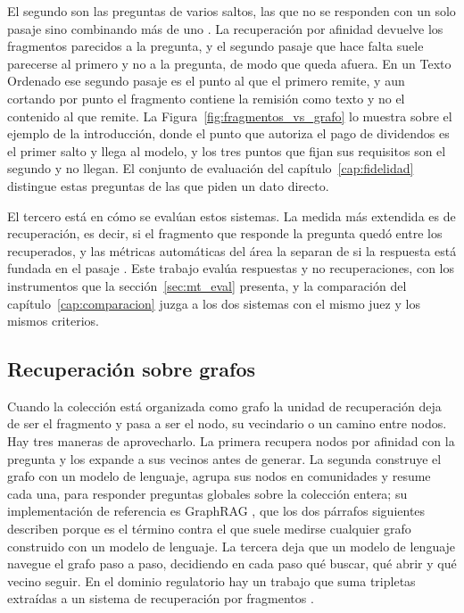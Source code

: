 \documentclass[12pt,a4paper]{report}
\begin{document}
El segundo son las preguntas de varios saltos, las que no se responden con un solo pasaje sino combinando más de uno \cite{yang2018hotpotqa}. La recuperación por afinidad devuelve los fragmentos parecidos a la pregunta, y el segundo pasaje que hace falta suele parecerse al primero y no a la pregunta, de modo que queda afuera. En un Texto Ordenado ese segundo pasaje es el punto al que el primero remite, y aun cortando por punto el fragmento contiene la remisión como texto y no el contenido al que remite. La Figura~\ref{fig:fragmentos_vs_grafo} lo muestra sobre el ejemplo de la introducción, donde el punto que autoriza el pago de dividendos es el primer salto y llega al modelo, y los tres puntos que fijan sus requisitos son el segundo y no llegan. El conjunto de evaluación del capítulo~\ref{cap:fidelidad} distingue estas preguntas de las que piden un dato directo.

El tercero está en cómo se evalúan estos sistemas. La medida más extendida es de recuperación, es decir, si el fragmento que responde la pregunta quedó entre los recuperados, y las métricas automáticas del área la separan de si la respuesta está fundada en el pasaje \cite{es2024ragas}. Este trabajo evalúa respuestas y no recuperaciones, con los instrumentos que la sección~\ref{sec:mt_eval} presenta, y la comparación del capítulo~\ref{cap:comparacion} juzga a los dos sistemas con el mismo juez y los mismos criterios.

\subsection{Recuperación sobre grafos}
\label{sec:mt_grafos}

Cuando la colección está organizada como grafo la unidad de recuperación deja de ser el fragmento y pasa a ser el nodo, su vecindario o un camino entre nodos. Hay tres maneras de aprovecharlo. La primera recupera nodos por afinidad con la pregunta y los expande a sus vecinos antes de generar. La segunda construye el grafo con un modelo de lenguaje, agrupa sus nodos en comunidades y resume cada una, para responder preguntas globales sobre la colección entera; su implementación de referencia es GraphRAG \cite{edge2024graphrag}, que los dos párrafos siguientes describen porque es el término contra el que suele medirse cualquier grafo construido con un modelo de lenguaje. La tercera deja que un modelo de lenguaje navegue el grafo paso a paso, decidiendo en cada paso qué buscar, qué abrir y qué vecino seguir. En el dominio regulatorio hay un trabajo que suma tripletas extraídas a un sistema de recuperación por fragmentos \cite{agarwal2025ragulating}.
\end{document}
